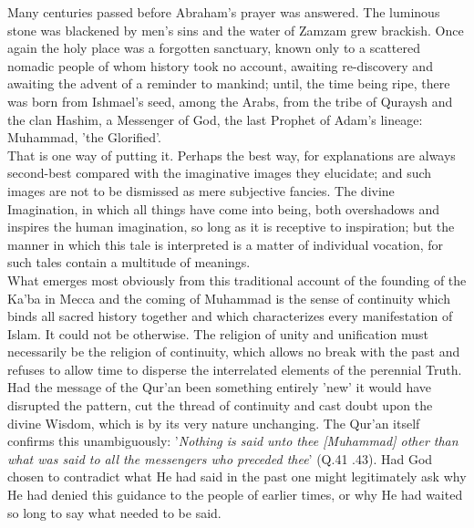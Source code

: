 \documentclass[10pt, twoside,openright]{book}
\begin{document}
Many centuries passed before Abraham's prayer was answered. The luminous stone was blackened by men's sins and the water of Zamzam grew brackish. Once again the holy place was a forgotten sanctuary, 
known only to a scattered nomadic people of whom history took no account, awaiting re\hyp{}discovery and 
awaiting the advent of a reminder to mankind; until, the time being ripe, there was born from 
Ishmael's seed, among the Arabs, from the tribe of Quraysh and the clan Hashim, a Messenger of God, 
the last Prophet of Adam's lineage: Muhammad, 'the Glorified'. \\

That is one way of putting it. Perhaps the best way, for explanations are always second\hyp{}best compared with the imaginative images they elucidate; and such images are not to be dismissed as mere 
subjective fancies. The divine Imagination, in which all things have come into being, both 
overshadows and inspires the human imagination, so long as it is receptive to inspiration; but the 
manner in which this tale is interpreted is a matter of individual vocation, for such tales contain a 
multitude of meanings. \\

What emerges most obviously from this traditional account of the founding of the Ka'ba in Mecca and 
the coming of Muhammad is the sense of continuity which binds all sacred history together and which 
characterizes every manifestation of Islam. It could not be otherwise. The religion of unity and 
unification must necessarily be the religion of continuity, which allows no break with the past and 
refuses to allow time to disperse the interrelated elements of the perennial Truth. Had the message 
of the Qur'an been something entirely 'new' it would have disrupted the pattern, cut the thread of 
continuity and cast doubt upon the divine Wisdom, which is by its very nature unchanging. The Qur'an 
itself confirms this unambiguously: '\emph{Nothing is said unto thee [Muhammad] other than what was said to all the messengers who preceded thee}' (Q.41 .43). Had God chosen to contradict what He had said in the past one might legitimately ask why He had denied this guidance to the people of earlier times, 
or why He had waited so long to say what needed to be said. \\
\end{document}
